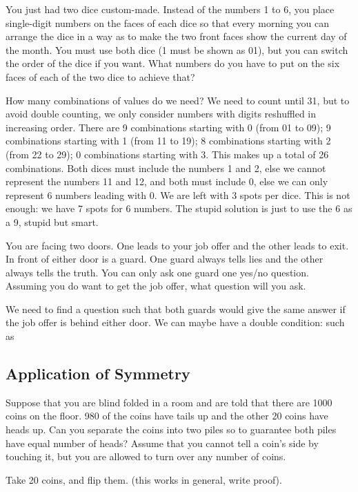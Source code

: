 \begin{qanda} %
    \Q You just had two dice custom-made. 
    Instead of the numbers 1 to 6, you place single-digit numbers on the faces of each dice so that every morning you can arrange the dice in a way as to make the two front faces show the current day of the month. 
    You must use both dice (1 must be shown as 01), but you can switch the order of the dice if you want. What numbers do you have to put on the six faces of each of the two dice to achieve that?

    \A How many combinations of values do we need? We need to count until 31, but to avoid double counting, we only consider numbers with digits reshuffled in increasing order.
    There are 9 combinations starting with 0 (from 01 to 09); 9 combinations starting with 1 (from 11 to 19); 8 combinations starting with 2 (from 22 to 29); 0 combinations starting with 3.
    This makes up a total of 26 combinations. 
    Both dices must include the numbers 1 and 2, else we cannot represent the numbers 11 and 12, and both must include 0, else we can only represent 6 numbers leading with 0.
    We are left with 3 spots per dice.
    This is not enough: we have 7 spots for 6 numbers.
    The stupid solution is just to use the 6 as a 9, stupid but smart.
\end{qanda}

\begin{qanda} %
    \Q You are facing two doors.
    One leads to your job offer and the other leads to exit.
    In front of either door is a guard.
    One guard always tells lies and the other always tells the truth. 
    You can only ask one guard one yes/no question.
    Assuming you do want to get the job offer, what question will you ask.

    \A We need to find a question such that both guards would give the same answer if the job offer is behind either door. We can maybe have a double condition: such as 
\end{qanda}


\subsection{Application of Symmetry}

\begin{qanda} %
  \Q Suppose that you are blind folded in a room and are told that there are 1000 coins on the floor.
  980 of the coins have tails up and the other 20 coins have heads up. 
  Can you separate the coins into two piles so to guarantee both piles have equal number of heads? 
  Assume that you cannot tell a coin's side by touching it, but you are allowed to turn over any number of coins.

  \A Take 20 coins, and flip them. (this works in general, write proof).
\end{qanda}

